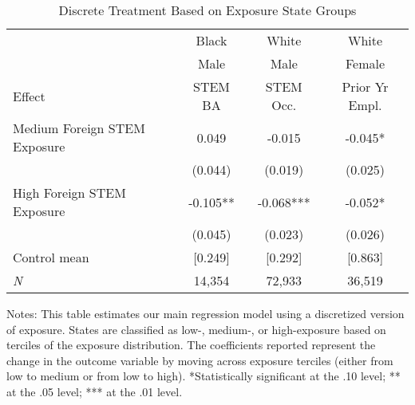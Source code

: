 \begin{table}[ht]
\caption{Discrete Treatment Based on Exposure State Groups}
\label{tab:ta5}
\centering
\begin{threeparttable}
\begin{tabular}{lccc}
\toprule 
       & Black           & White        & White       \\
       & Male            & Male         & Female      \\
Effect & STEM BA         & STEM Occ.    & Prior Yr Empl.\\
\midrule 
Medium Foreign STEM Exposure & 0.049  & -0.015  & -0.045* \\ 
 &  (0.044)        & (0.019)        & (0.025) \\ 
High Foreign STEM Exposure & -0.105** & -0.068*** & -0.052* \\ 
 &  (0.045)        & (0.023)        & (0.026) \\ 
Control mean &  [0.249]        & [0.292]       & [0.863] \\ 
\emph{N} &     14,354          &    72,933          &    36,519 \\ 
\bottomrule 
\end{tabular} 
\footnotesize Notes: This table estimates our main regression model using a discretized version of exposure. States are classified as low-, medium-, or high-exposure based on terciles of the exposure distribution. The coefficients reported represent the change in the outcome variable by moving across exposure terciles (either from low to medium or from low to high). *Statistically significant at the .10 level; ** at the .05 level; *** at the .01 level.
\end{threeparttable} 
\end{table} 
